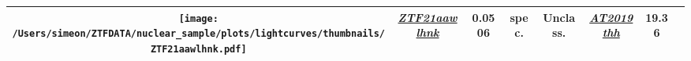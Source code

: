 \begin{table*}[t!]
{\begin{tabular}{c  c  c  c  c  c  c  c}
      \parbox[c]{12em}{\texttt{[image: /Users/simeon/ZTFDATA/nuclear\_sample/plots/lightcurves/thumbnails/ZTF21aawlhnk.pdf]}} & \textit{\href{https://ztfnuclear.simeonreusch.com/transient/ZTF21aawlhnk}{ZTF21aawlhnk}}           & 0.0506         & spec.          & Unclass.                & \textit{\href{https://www.wis-tns.org/object/2019thh}{AT2019thh}}            & 19.36                      & \cite{Velzen2021}   \\
      \hline
    \end{tabular}}
\end{table*}